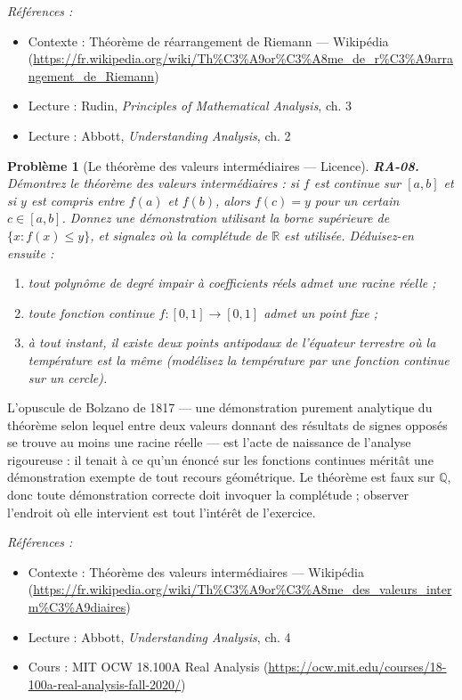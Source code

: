 \documentclass[11pt]{article}
\newtheorem{problem}{Problème}
\newenvironment{refs}{\par\small\noindent\emph{Références :}\begin{itemize}\setlength\itemsep{0pt}}{\end{itemize}\normalsize}
\begin{document}
\begin{refs}
\item Contexte : Théorème de réarrangement de Riemann --- Wikipédia (\url{https://fr.wikipedia.org/wiki/Th%C3%A9or%C3%A8me_de_r%C3%A9arrangement_de_Riemann})
\item Lecture : Rudin, \textit{Principles of Mathematical Analysis}, ch. 3
\item Lecture : Abbott, \textit{Understanding Analysis}, ch. 2
\end{refs}

\bigskip

\begin{problem}[{Le théorème des valeurs intermédiaires --- Licence}]
\textbf{RA-08.} Démontrez le théorème des valeurs intermédiaires : si $ f $ est
continue sur $ [a, b] $ et si $ y $ est compris entre $ f(a) $ et $ f(b) $, alors
$ f(c) = y $ pour un certain $ c \in [a, b] $. Donnez une démonstration utilisant la borne
supérieure de $ \{ x : f(x) \le y \} $, et signalez où la complétude de $ \mathbb{R} $ est
utilisée. Déduisez-en ensuite :
\begin{enumerate}
\item[(a)] tout polynôme de degré impair à coefficients réels admet une racine réelle ;
\item[(b)] toute
fonction continue $ f : [0, 1] \to [0, 1] $ admet un point fixe ;
\item[(c)] à tout instant, il existe
deux points antipodaux de l'équateur terrestre où la température est la même (modélisez la
température par une fonction continue sur un cercle).
\end{enumerate}

\end{problem}

\noindent L'opuscule de Bolzano de 1817 --- \og{} une démonstration purement analytique du
théorème selon lequel entre deux valeurs donnant des résultats de signes opposés se trouve au moins
une racine réelle \fg{} --- est l'acte de naissance de l'analyse rigoureuse : il tenait à ce qu'un énoncé
sur les fonctions continues méritât une démonstration exempte de tout recours géométrique. Le
théorème est faux sur $\mathbb{Q}$, donc toute démonstration correcte doit invoquer la complétude ; observer
l'endroit où elle intervient est tout l'intérêt de l'exercice.

\begin{refs}
\item Contexte : Théorème des valeurs intermédiaires --- Wikipédia (\url{https://fr.wikipedia.org/wiki/Th%C3%A9or%C3%A8me_des_valeurs_interm%C3%A9diaires})
\item Lecture : Abbott, \textit{Understanding Analysis}, ch. 4
\item Cours : MIT OCW 18.100A Real Analysis (\url{https://ocw.mit.edu/courses/18-100a-real-analysis-fall-2020/})
\end{refs}
\end{document}
